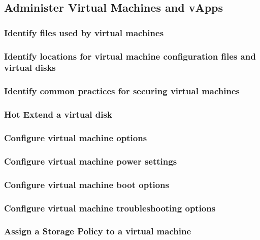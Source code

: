 \subsection{Administer Virtual Machines and vApps}

\subsubsection{Identify files used by virtual machines}

\subsubsection{Identify locations for virtual machine configuration files and virtual disks}

\subsubsection{Identify common practices for securing virtual machines}

\subsubsection{Hot Extend a virtual disk}

\subsubsection{Configure virtual machine options}

\subsubsection{Configure virtual machine power settings}

\subsubsection{Configure virtual machine boot options}

\subsubsection{Configure virtual machine troubleshooting options}

\subsubsection{Assign a Storage Policy to a virtual machine}

